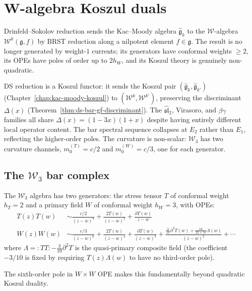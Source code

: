 \chapter{W-algebra Koszul duals}\label{chap:w-algebra-koszul}
\label{chap:w-algebras}


Drinfeld--Sokolov reduction \cite{DS, FF} sends the Kac--Moody algebra
$\widehat{\mathfrak{g}}_k$ to the $\mathcal{W}$-algebra
$\mathcal{W}^k(\mathfrak{g}, f)$ by BRST reduction along a nilpotent
element $f \in \mathfrak{g}$.  The result is no longer generated by
weight-$1$ currents; its generators have conformal weights $\geq 2$, its
OPEs have poles of order up to $2h_W$, and its Koszul theory is
genuinely non-quadratic.


DS reduction is a Koszul functor: it sends the Koszul pair
$(\widehat{\mathfrak{g}}_k, \widehat{\mathfrak{g}}_{k'})$
(Chapter~\ref{chap:kac-moody-koszul}) to
$(\mathcal{W}^k, \mathcal{W}^{k'})$, preserving the
discriminant $\Delta(x)$
(Theorem~\ref{thm:ds-bar-gf-discriminant}).  The
$\widehat{\mathfrak{sl}}_2$, Virasoro, and $\beta\gamma$ families
all share $\Delta(x) = (1-3x)(1+x)$ despite having entirely
different local operator content.  The bar spectral sequence collapses
at $E_2$ rather than $E_1$, reflecting the higher-order poles.  The
curvature is non-scalar: $\mathcal{W}_3$ has two curvature channels,
$m_0^{(T)} = c/2$ and $m_0^{(W)} = c/3$, one for each generator.

\section{The $\mathcal{W}_3$ bar complex}

\begin{example}\label{ex:w3-ope-structure}
The $\mathcal{W}_3$ algebra has two generators: the stress tensor $T$ of conformal weight $h_T = 2$ and a primary field $W$ of conformal weight $h_W = 3$, with OPEs:
\begin{align}
T(z)T(w) &\sim \frac{c/2}{(z-w)^4} + \frac{2T(w)}{(z-w)^2} + \frac{\partial T(w)}{z-w} \\
W(z)W(w) &\sim \frac{c/3}{(z-w)^6} + \frac{2T(w)}{(z-w)^4} + \frac{\partial T(w)}{(z-w)^3} + \frac{\frac{3}{10}\partial^2 T(w) + \frac{16}{22+5c}\Lambda(w)}{(z-w)^2} + \cdots
\end{align}
where $\Lambda = {:}TT{:} - \frac{3}{10}\partial^2 T$ is the quasi-primary composite field (the coefficient $-3/10$ is fixed by requiring $T(z)\Lambda(w)$ to have no third-order pole).

The sixth-order pole in $W \times W$ OPE makes this fundamentally beyond quadratic Koszul duality.
\end{example}


